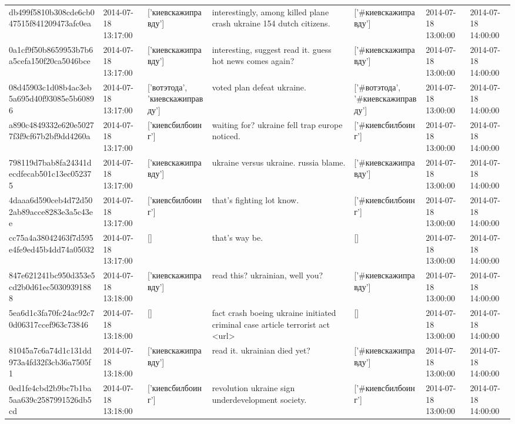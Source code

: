 \begin{tabular}{lllllll}
db499f5810b308cde6cb047515f841209473afc0ea & 2014-07-18 13:17:00 & ['киевскажиправду'] & interestingly, among killed plane crash ukraine 154 dutch citizens. & ['#киевскажиправду'] & 2014-07-18 13:00:00 & 2014-07-18 14:00:00 \\
0a1cf9f50b8659953b7b6a5cefa150f20ca5046bce & 2014-07-18 13:17:00 & ['киевскажиправду'] & interesting, suggest read it. guess hot news comes again? & ['#киевскажиправду'] & 2014-07-18 13:00:00 & 2014-07-18 14:00:00 \\
08d45903c1d08b4ac3eb5a695d40f93085e5b60896 & 2014-07-18 13:17:00 & ['вотэтода', 'киевскажиправду'] & voted plan defeat ukraine. & ['#вотэтода', '#киевскажиправду'] & 2014-07-18 13:00:00 & 2014-07-18 14:00:00 \\
a890c4849332e620e50277f3f9cf67b2bf9dd4260a & 2014-07-18 13:17:00 & ['киевсбилбоинг'] & waiting for? ukraine fell trap europe noticed. & ['#киевсбилбоинг'] & 2014-07-18 13:00:00 & 2014-07-18 14:00:00 \\
798119d7bab8fa24341decdfecab501c13ec052375 & 2014-07-18 13:17:00 & ['киевскажиправду'] & ukraine versus ukraine. russia blame. & ['#киевскажиправду'] & 2014-07-18 13:00:00 & 2014-07-18 14:00:00 \\
4daaa6d590ceb4d72d502ab89acce8283e3a5c43ee & 2014-07-18 13:17:00 & ['киевсбилбоинг'] & that's fighting lot know. & ['#киевсбилбоинг'] & 2014-07-18 13:00:00 & 2014-07-18 14:00:00 \\
cc75a4a38042463f7d595e4fe9ed45b4dd74a05032 & 2014-07-18 13:17:00 & [] & that's way be. & [] & 2014-07-18 13:00:00 & 2014-07-18 14:00:00 \\
847e621241bc950d353e5cd2b0d61ec50309391888 & 2014-07-18 13:18:00 & ['киевскажиправду'] & read this? ukrainian, well you? & ['#киевскажиправду'] & 2014-07-18 13:00:00 & 2014-07-18 14:00:00 \\
5ea6d1c3fa70fc24ac92c70d06317ccef963c73846 & 2014-07-18 13:18:00 & [] & fact crash boeing ukraine initiated criminal case article terrorist act <url> & [] & 2014-07-18 13:00:00 & 2014-07-18 14:00:00 \\
81045a7c6a74d1c131dd973a4fd32f3cb36a7505f1 & 2014-07-18 13:18:00 & ['киевскажиправду'] & read it. ukrainian died yet? & ['#киевскажиправду'] & 2014-07-18 13:00:00 & 2014-07-18 14:00:00 \\
0ed1fe4cbd2b9bc7b1ba5aa639c2587991526db5cd & 2014-07-18 13:18:00 & ['киевсбилбоинг'] & revolution ukraine sign underdevelopment society. & ['#киевсбилбоинг'] & 2014-07-18 13:00:00 & 2014-07-18 14:00:00 \\

\end{tabular}

